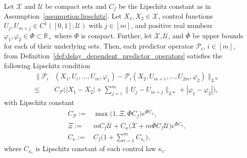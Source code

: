 \documentclass[10pt,a4paper]{amsart}
\begin{document}
\begin{lemma}\label{lemma:predictor-continuity}
Let $\mathcal{X}$ and $\mathcal{U}$ be compact sets and $C_f$ be the Lipschitz constant as in Assumption~\ref{assumption:lipschitz}. Let $X_1, X_2 \in \mathcal{X}$, control functions $U_j, U_{m+j} \in C^1([0,1];\mathcal{U})$ with $j \in [m]$, and positive real numbers $\varphi_1, \varphi_2 \in \Phi \subset \mathbb{R}_+$ where $\Phi$ is compact. Further, let $\overline{\mathcal{X}}, \overline{\mathcal{U}}$, and $\overline{\Phi}$ be upper bounds for each of their underlying sets. Then, each predictor operator $\mathcal{P}_i$, $i \in [m]$, from Definition~\ref{def:delay_dependent_predictor_operators} satisfies the following Lipschitz condition
\begin{align}
    \bigg\| \mathcal{P}_i&(X_1,U_i,\dots,U_m,\varphi_1) - \mathcal{P}_i(X_2,U_{m+i},\dots,U_{2m},\varphi_2) \bigg\|_{L^\infty} \nonumber  \\
    \leq& C_{\mathcal{P}} \Biggl( |X_1 - X_2| + \sum_{j=i}^m \bigg\| U_j - U_{m+j} \bigg\|_{L^\infty} 
    + |\varphi_1 - \varphi_2| \Biggr), \label{eq:predictor_lipschitz_inequality}
\end{align}
with Lipschitz constant
\begin{align}
    C_{\mathcal{P}} :=& \max \bigg( 1, \Xi, \overline{\Phi} C_f \bigg) e^{\overline{\Phi} C_{\kappa}}, \\ 
    \Xi  :=& m C_f \overline{\mathcal{U}} + C_{\kappa} \bigg( \overline{\mathcal{X}} + m \overline{\Phi} C_f \overline{\mathcal{U}} \bigg) e^{\overline{\Phi} C_{\kappa}}, \\
    C_{\kappa}  :=& C_f \bigg( 1 + \sum_{i=1}^m C_{\kappa_i} \bigg), \label{eq:c_kappa}
\end{align}
where $C_{\kappa_i}$ is Lipschitz constant of each control law $\kappa_i$.
\end{lemma}
\end{document}
